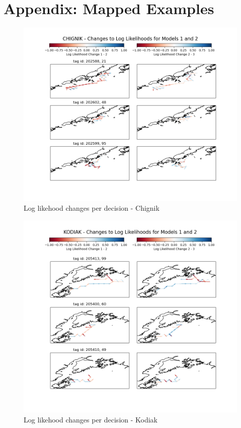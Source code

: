 \documentclass[11pt]{article}
\begin{document}


\newpage
\section*{Appendix: Mapped Examples}

\begin{figure}[h!] 
	\centering
  \includegraphics[width=140mm]{figures/chignik_map.png}
  \caption{Log likehood changes per decision - Chignik}
  \label{fig:chignik_map}
\end{figure}

\begin{figure}[h!] 
	\centering
  \includegraphics[width=140mm]{figures/kodiak_map.png}
  \caption{Log likehood changes per decision - Kodiak}
  \label{fig:kodiak_map}
\end{figure}
\end{document}
